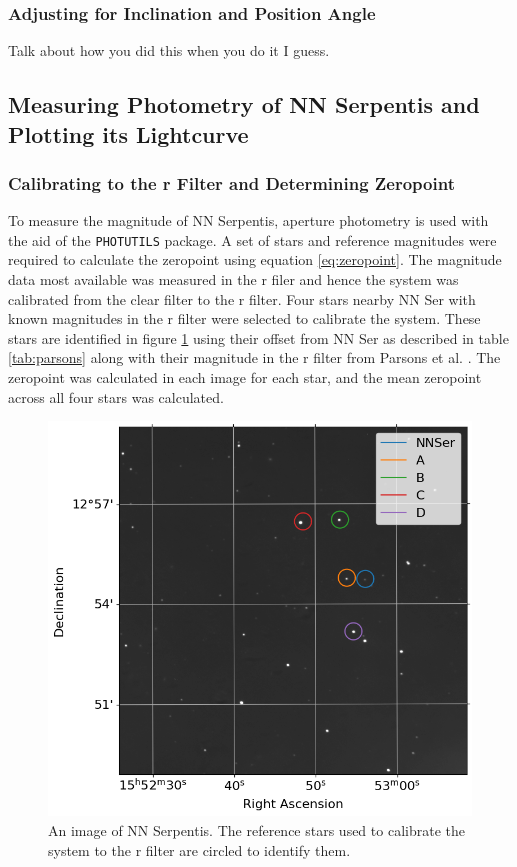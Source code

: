 \documentclass[%
reprint,
amsmath,amssymb,
aps,
]{revtex4-2}
\begin{document}
			\subsubsection{Adjusting for Inclination and Position Angle}
				Talk about how you did this when you do it I guess.
		
		\subsection{Measuring Photometry of NN Serpentis and Plotting its Lightcurve}
			
			\subsubsection{Calibrating to the r Filter and Determining Zeropoint}
				To measure the magnitude of NN Serpentis, aperture photometry is used with the aid of the \texttt{PHOTUTILS} package. A set of stars and reference magnitudes were required to calculate the zeropoint using equation \ref{eq:zeropoint}. The magnitude data most available was measured in the r filer and hence the system was calibrated from the clear filter to the r filter. Four stars nearby NN Ser with known magnitudes in the r filter were selected to calibrate the system. These stars are identified in figure \ref{fig:rBandStars} using their offset from NN Ser as described in table \ref{tab:parsons} along with their magnitude in the r filter from Parsons et al. \cite{parsons}. The zeropoint was calculated in each image for each star, and the mean zeropoint across all four stars was calculated.
				
				\begin{figure}
					\includegraphics[width=\columnwidth]{rBandStars.png}
					\caption{\label{fig:rBandStars} An image of NN Serpentis. The reference stars used to calibrate the system to the r filter are circled to identify them.}
				\end{figure}
			
\end{document}
